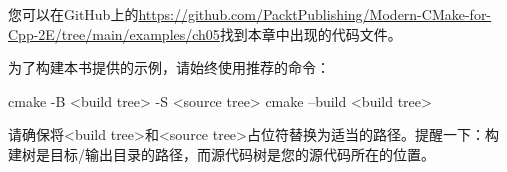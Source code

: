 您可以在GitHub上的\url{https://github.com/PacktPublishing/Modern-CMake-for-Cpp-2E/tree/main/examples/ch05}找到本章中出现的代码文件。

为了构建本书提供的示例，请始终使用推荐的命令：

\begin{shell}
cmake -B <build tree> -S <source tree>
cmake --build <build tree>
\end{shell}

请确保将<build tree>和<source tree>占位符替换为适当的路径。提醒一下：构建树是目标/输出目录的路径，而源代码树是您的源代码所在的位置。








